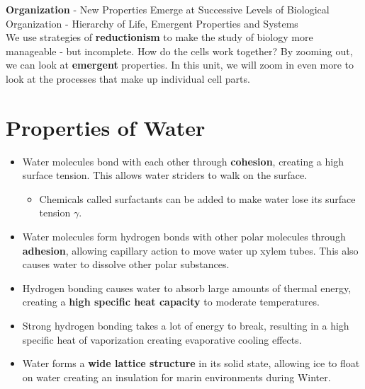\documentclass[letterpaper]{article}
\begin{document}
\maketitle

\tableofcontents
\newpage

\begin{review}
    \textbf{Organization} - New Properties Emerge at Successive Levels of Biological Organization - Hierarchy of Life, Emergent Properties and Systems \\

    We use strategies of \textbf{reductionism} to make the study of biology more manageable - but incomplete. How do the cells work together? By zooming out, we can look at \textbf{emergent} properties. In this unit, we will zoom in even more to look at the processes that make up individual cell parts.
\end{review}
\section{Properties of Water}
\begin{itemize}
    \item Water molecules bond with each other through \textbf{cohesion}, creating a high surface tension. This allows water striders to walk on the surface.
    \begin{itemize}
        \item Chemicals called surfactants can be added to make water lose its surface tension $\gamma$.
    \end{itemize}
    \item Water molecules form hydrogen bonds with other polar molecules through \textbf{adhesion}, allowing capillary action to move water up xylem tubes. This also causes water to dissolve other polar substances.
    \item Hydrogen bonding causes water to absorb large amounts of thermal energy, creating a \textbf{high specific heat capacity} to moderate temperatures.
    \item Strong hydrogen bonding takes a lot of energy to break, resulting in a high specific heat of vaporization creating evaporative cooling effects.
    \item Water forms a \textbf{wide lattice structure} in its solid state, allowing ice to float on water creating an insulation for marin environments during Winter.
\end{itemize}
\newpage
\end{document}
